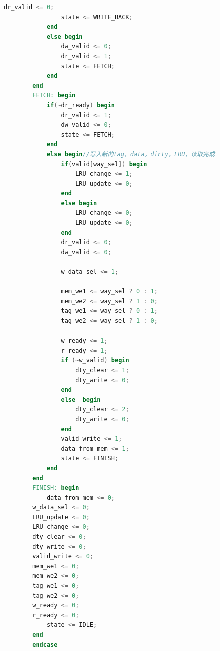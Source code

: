 \documentclass[a4paper]{article}
\begin{document}
\begin{lstlisting}[language={verilog},title={fsm.v}]
                dr_valid <= 0;
                state <= WRITE_BACK;
            end
            else begin
                dw_valid <= 0;
                dr_valid <= 1;
                state <= FETCH;
            end
        end
        FETCH: begin
            if(~dr_ready) begin
                dr_valid <= 1;
                dw_valid <= 0;
                state <= FETCH;
            end
            else begin//写入新的tag，data，dirty，LRU，读取完成
                if(valid[way_sel]) begin
                    LRU_change <= 1;
                    LRU_update <= 0;
                end
                else begin
                    LRU_change <= 0;
                    LRU_update <= 0;
                end
                dr_valid <= 0;
                dw_valid <= 0;

                w_data_sel <= 1;

                mem_we1 <= way_sel ? 0 : 1;
                mem_we2 <= way_sel ? 1 : 0;
                tag_we1 <= way_sel ? 0 : 1;
                tag_we2 <= way_sel ? 1 : 0;

                w_ready <= 1;
                r_ready <= 1;
                if (~w_valid) begin
                    dty_clear <= 1;
                    dty_write <= 0;
                end
                else  begin
                    dty_clear <= 2;
                    dty_write <= 0;
                end
                valid_write <= 1;
                data_from_mem <= 1;
                state <= FINISH;
            end
        end
        FINISH: begin
            data_from_mem <= 0;
        w_data_sel <= 0;
        LRU_update <= 0;
        LRU_change <= 0;
        dty_clear <= 0;
        dty_write <= 0;
        valid_write <= 0;
        mem_we1 <= 0;
        mem_we2 <= 0;
        tag_we1 <= 0;
        tag_we2 <= 0;
        w_ready <= 0;
        r_ready <= 0;
            state <= IDLE;
        end
        endcase
\end{lstlisting}
\end{document}
